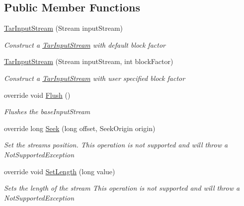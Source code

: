 \subsection*{Public Member Functions}
\begin{DoxyCompactItemize}
\item 
\hyperlink{class_i_c_sharp_code_1_1_sharp_zip_lib_1_1_tar_1_1_tar_input_stream_ac2d03f1ad9b823d9d151bc38f969ae72}{Tar\+Input\+Stream} (Stream input\+Stream)
\begin{DoxyCompactList}\small\item\em Construct a \hyperlink{class_i_c_sharp_code_1_1_sharp_zip_lib_1_1_tar_1_1_tar_input_stream}{Tar\+Input\+Stream} with default block factor \end{DoxyCompactList}\item 
\hyperlink{class_i_c_sharp_code_1_1_sharp_zip_lib_1_1_tar_1_1_tar_input_stream_a0249a27f3030b2b2d4df7acb1f5174e1}{Tar\+Input\+Stream} (Stream input\+Stream, int block\+Factor)
\begin{DoxyCompactList}\small\item\em Construct a \hyperlink{class_i_c_sharp_code_1_1_sharp_zip_lib_1_1_tar_1_1_tar_input_stream}{Tar\+Input\+Stream} with user specified block factor \end{DoxyCompactList}\item 
override void \hyperlink{class_i_c_sharp_code_1_1_sharp_zip_lib_1_1_tar_1_1_tar_input_stream_a11e34c8d1247f2b8194c04aa987aa8fe}{Flush} ()
\begin{DoxyCompactList}\small\item\em Flushes the base\+Input\+Stream \end{DoxyCompactList}\item 
override long \hyperlink{class_i_c_sharp_code_1_1_sharp_zip_lib_1_1_tar_1_1_tar_input_stream_a8f91505f427260c2814c686d79b28ba4}{Seek} (long offset, Seek\+Origin origin)
\begin{DoxyCompactList}\small\item\em Set the streams position. This operation is not supported and will throw a Not\+Supported\+Exception \end{DoxyCompactList}\item 
override void \hyperlink{class_i_c_sharp_code_1_1_sharp_zip_lib_1_1_tar_1_1_tar_input_stream_a81fe60e776e8fba0a582a18dcd410113}{Set\+Length} (long value)
\begin{DoxyCompactList}\small\item\em Sets the length of the stream This operation is not supported and will throw a Not\+Supported\+Exception \end{DoxyCompactList}\item 

\end{DoxyCompactItemize}
